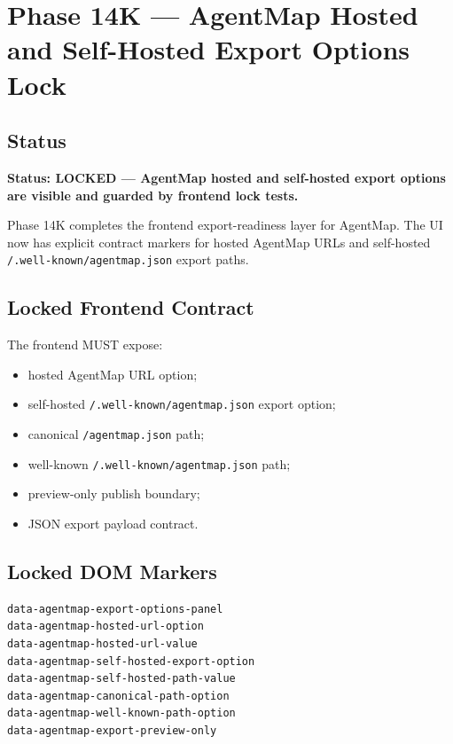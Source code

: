 \section{Phase 14K --- AgentMap Hosted and Self-Hosted Export Options Lock}
\label{sec:phase14k-agentmap-frontend-export-options}

\subsection{Status}

\textbf{Status: LOCKED --- AgentMap hosted and self-hosted export options are visible and guarded by frontend lock tests.}

Phase 14K completes the frontend export-readiness layer for AgentMap. The UI now has explicit contract markers for hosted AgentMap URLs and self-hosted \texttt{/.well-known/agentmap.json} export paths.

\subsection{Locked Frontend Contract}

The frontend MUST expose:

\begin{itemize}
  \item hosted AgentMap URL option;
  \item self-hosted \texttt{/.well-known/agentmap.json} export option;
  \item canonical \texttt{/agentmap.json} path;
  \item well-known \texttt{/.well-known/agentmap.json} path;
  \item preview-only publish boundary;
  \item JSON export payload contract.
\end{itemize}

\subsection{Locked DOM Markers}

\begin{verbatim}
data-agentmap-export-options-panel
data-agentmap-hosted-url-option
data-agentmap-hosted-url-value
data-agentmap-self-hosted-export-option
data-agentmap-self-hosted-path-value
data-agentmap-canonical-path-option
data-agentmap-well-known-path-option
data-agentmap-export-preview-only
\end{verbatim}

